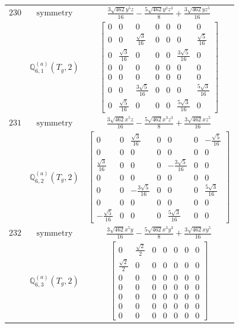 \documentclass[fleqn,8pt,landscape]{jsarticle}
\begin{document}
\begin{longtable}{ccc}
$ 230 $ & $ \text{symmetry} $ & $ \frac{3 \sqrt{462} y^{5} z}{16} - \frac{5 \sqrt{462} y^{3} z^{3}}{8} + \frac{3 \sqrt{462} y z^{5}}{16} $ \\
$  $ & $ \mathbb{Q}_{6,1}^{(a)}(T_{g},2) $ & $ \begin{bmatrix} 0 & 0 & 0 & 0 & 0 & 0 & 0 \\ 0 & 0 & \frac{\sqrt{3}}{16} & 0 & 0 & 0 & \frac{\sqrt{5}}{16} \\ 0 & \frac{\sqrt{3}}{16} & 0 & 0 & 0 & \frac{3 \sqrt{5}}{16} & 0 \\ 0 & 0 & 0 & 0 & 0 & 0 & 0 \\ 0 & 0 & 0 & 0 & 0 & 0 & 0 \\ 0 & 0 & \frac{3 \sqrt{5}}{16} & 0 & 0 & 0 & \frac{5 \sqrt{3}}{16} \\ 0 & \frac{\sqrt{5}}{16} & 0 & 0 & 0 & \frac{5 \sqrt{3}}{16} & 0 \end{bmatrix} $ \\ \hline
$ 231 $ & $ \text{symmetry} $ & $ \frac{3 \sqrt{462} x^{5} z}{16} - \frac{5 \sqrt{462} x^{3} z^{3}}{8} + \frac{3 \sqrt{462} x z^{5}}{16} $ \\
$  $ & $ \mathbb{Q}_{6,2}^{(a)}(T_{g},2) $ & $ \begin{bmatrix} 0 & 0 & \frac{\sqrt{3}}{16} & 0 & 0 & 0 & - \frac{\sqrt{5}}{16} \\ 0 & 0 & 0 & 0 & 0 & 0 & 0 \\ \frac{\sqrt{3}}{16} & 0 & 0 & 0 & - \frac{3 \sqrt{5}}{16} & 0 & 0 \\ 0 & 0 & 0 & 0 & 0 & 0 & 0 \\ 0 & 0 & - \frac{3 \sqrt{5}}{16} & 0 & 0 & 0 & \frac{5 \sqrt{3}}{16} \\ 0 & 0 & 0 & 0 & 0 & 0 & 0 \\ - \frac{\sqrt{5}}{16} & 0 & 0 & 0 & \frac{5 \sqrt{3}}{16} & 0 & 0 \end{bmatrix} $ \\ \hline
$ 232 $ & $ \text{symmetry} $ & $ \frac{3 \sqrt{462} x^{5} y}{16} - \frac{5 \sqrt{462} x^{3} y^{3}}{8} + \frac{3 \sqrt{462} x y^{5}}{16} $ \\
$  $ & $ \mathbb{Q}_{6,3}^{(a)}(T_{g},2) $ & $ \begin{bmatrix} 0 & \frac{\sqrt{2}}{2} & 0 & 0 & 0 & 0 & 0 \\ \frac{\sqrt{2}}{2} & 0 & 0 & 0 & 0 & 0 & 0 \\ 0 & 0 & 0 & 0 & 0 & 0 & 0 \\ 0 & 0 & 0 & 0 & 0 & 0 & 0 \\ 0 & 0 & 0 & 0 & 0 & 0 & 0 \\ 0 & 0 & 0 & 0 & 0 & 0 & 0 \\ 0 & 0 & 0 & 0 & 0 & 0 & 0 \end{bmatrix} $ \\ \hline

\end{longtable}
\end{document}
